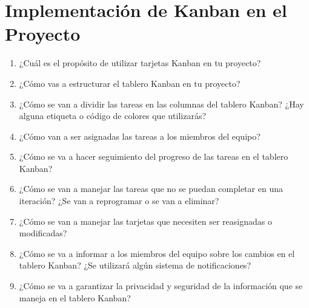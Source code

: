 \documentclass[../main]{subfiles}
\begin{document}
\chapter{Implementación de Kanban en el Proyecto}

\begin{enumerate}
\item ¿Cuál es el propósito de utilizar tarjetas Kanban en tu proyecto?
\item ¿Cómo vas a estructurar el tablero Kanban en tu proyecto? 
\item ¿Cómo se van a dividir las tareas en las columnas del tablero Kanban? ¿Hay alguna etiqueta o código de colores que utilizarás?
\item ¿Cómo van a ser asignadas las tareas a los miembros del equipo?
\item ¿Cómo se va a hacer seguimiento del progreso de las tareas en el tablero Kanban?
\item ¿Cómo se van a manejar las tareas que no se puedan completar en una iteración? ¿Se van a reprogramar o se van a eliminar?
\item ¿Cómo se van a manejar las tarjetas que necesiten ser reasignadas o modificadas?
\item ¿Cómo se va a informar a los miembros del equipo sobre los cambios en el tablero Kanban? ¿Se utilizará algún sistema de notificaciones?
\item ¿Cómo se va a garantizar la privacidad y seguridad de la información que se maneja en el tablero Kanban?
\end{enumerate}
\end{document}
